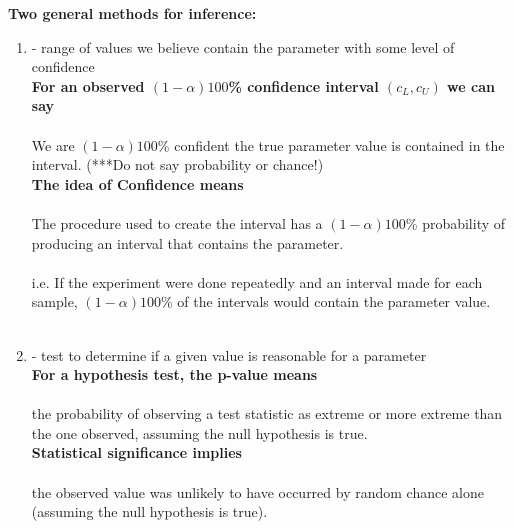 \noindent\Large \textbf{Two general methods for inference:}\large\\
\begin{enumerate}
\item 
\underbar{~~~~~~~~~~~~~~~~~~~~~~~~~~~~~~~~~~~~~~~~~~~~~~~~~~~~~~~~}
- range of values we believe contain the parameter with some level of confidence\\

\textbf{For an observed $(1-\alpha)100$\% confidence interval $(c_{L}, c_{U})$ we can say}\\~\\
We are $(1-\alpha)100$\% confident the true parameter value is contained in the interval.  (***Do not say probability or chance!)\\

\textbf{The idea of Confidence means}\\~\\
The procedure used to create the interval has a $(1-\alpha)100$\% probability of producing an interval that contains the parameter.\\~\\
i.e. If the experiment were done repeatedly and an interval made for each sample, $(1-\alpha)100$\% of the intervals would contain the parameter value.\\~\\

\item
\underbar{~~~~~~~~~~~~~~~~~~~~~~~~~~~~~~~~~~~~~~~~~~~~~~~~~~~~~~~~}
- test to determine if a given value is reasonable for a parameter\\

\textbf{For a hypothesis test, the p-value means}\\~\\
the probability of observing a test statistic as extreme or more extreme than the one observed, assuming the null hypothesis is true.\\

\textbf{Statistical significance implies}\\~\\
the observed value was unlikely to have occurred by random chance alone (assuming the null hypothesis is true).\\~\\
\end{enumerate}

